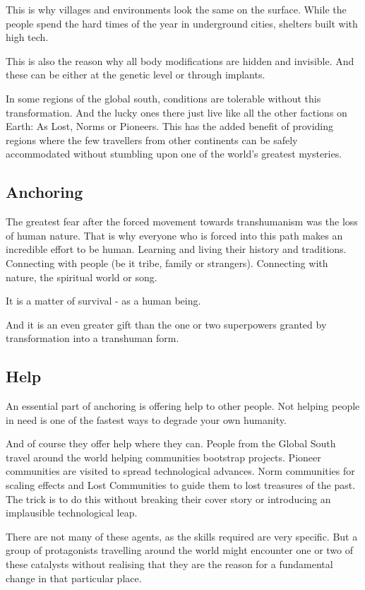 This is why villages and environments look the same on the surface. While the people spend the hard times of the year in underground cities, shelters built with high tech.

This is also the reason why all body modifications are hidden and invisible. And these can be either at the genetic level or through implants.

In some regions of the global south, conditions are tolerable without this transformation. And the lucky ones there just live like all the other factions on Earth: As Lost, Norms or Pioneers. This has the added benefit of providing regions where the few travellers from other continents can be safely accommodated without stumbling upon one of the world's greatest mysteries.

\subsection{Anchoring}

The greatest fear after the forced movement towards transhumanism was the loss of human nature.
That is why everyone who is forced into this path makes an incredible effort to be human. Learning and living their history and traditions. Connecting with people (be it tribe, family or strangers). Connecting with nature, the spiritual world or song.

It is a matter of survival - as a human being.

And it is an even greater gift than the one or two superpowers granted by transformation into a transhuman form.

\subsection{Help}

An essential part of anchoring is offering help to other people. Not helping people in need is one of the fastest ways to degrade your own humanity.

And of course they offer help where they can. People from the Global South travel around the world helping communities bootstrap projects. Pioneer communities are visited to spread technological advances. Norm communities for scaling effects and Lost Communities to guide them to lost treasures of the past. The trick is to do this without breaking their cover story or introducing an implausible technological leap.

There are not many of these agents, as the skills required are very specific. But a group of protagonists travelling around the world might encounter one or two of these catalysts without realising that they are the reason for a fundamental change in that particular place.

